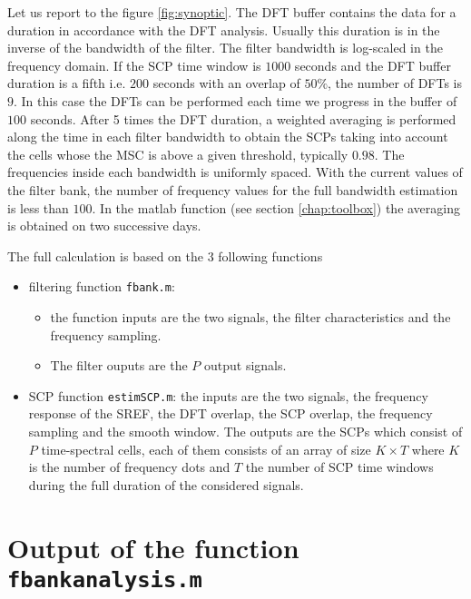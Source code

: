 Let us report to the figure \ref{fig:synoptic}. The DFT buffer contains the data for a duration in accordance with the DFT analysis. Usually this duration is in the inverse of the bandwidth of the filter. The filter bandwidth is log-scaled in the frequency domain. If the SCP time window is $1000$ seconds and the DFT buffer duration is  a fifth i.e. $200$ seconds with an overlap of $50\%$, the number of DFTs  is $9$. In this case the DFTs can be performed each time we progress in the buffer of $100$ seconds. After 5 times the DFT duration, a weighted averaging is performed along the time in each filter bandwidth to obtain the SCPs taking into account the cells whose the MSC is above a given threshold, typically $0.98$. The frequencies inside each bandwidth is uniformly spaced. With the current values of the filter bank, the number of frequency values for the full bandwidth estimation is less than $100$. In the matlab function (see section \ref{chap:toolbox}) the averaging is obtained on two successive days.





The full calculation is based on the 3 following functions
\begin{itemize}
\item 
filtering function {\tt fbank.m}: 
\begin{itemize}
\item
the function inputs are the two signals, the filter characteristics and the frequency sampling.
\item
The filter ouputs are the $P$ output signals.
\end{itemize}
\item  

SCP function {\tt estimSCP.m}: the inputs are the two signals, the frequency response of the SREF, 
the DFT overlap, the SCP overlap, the frequency sampling and the smooth window. The outputs are the SCPs which consist of $P$ time-spectral cells, each of them consists of an array of size $K \times T$ where $K$ is the number of frequency dots and $T$ the number of SCP time windows during the full duration of the considered signals.

\end{itemize}



\newpage\clearpage
\section{Output of the function {\tt fbankanalysis.m}}

